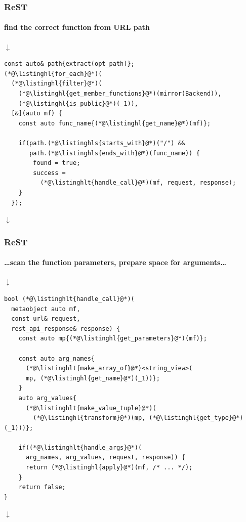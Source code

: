 \documentclass[compress,table,xcolor=table]{beamer}
\begin{document}
\begin{frame}[fragile]
  \frametitle{ReST}
  \framesubtitle{find the correct function from URL path}
  \smaller
  \centering $\downarrow$
  \begin{lstlisting}[language=c++2x,basicstyle=\footnotesize\ttfamily]
const auto& path{extract(opt_path)};
(*@\listinghl{for_each}@*)(
  (*@\listinghl{filter}@*)(
    (*@\listinghl{get_member_functions}@*)(mirror(Backend)),
    (*@\listinghl{is_public}@*)(_1)),
  [&](auto mf) {
    const auto func_name{(*@\listinghl{get_name}@*)(mf)};

    if(path.(*@\listinghls{starts_with}@*)("/") &&
       path.(*@\listinghls{ends_with}@*)(func_name)) {
        found = true;
        success =
          (*@\listinghlt{handle_call}@*)(mf, request, response);
    }
  });
  \end{lstlisting}
  \centering $\downarrow$
  \vfill
\end{frame}
\begin{frame}[fragile]
  \frametitle{ReST}
  \framesubtitle{\ldots scan the function parameters, prepare space for arguments\ldots}
  \smaller
  \centering $\downarrow$
  \begin{lstlisting}[language=c++2x,basicstyle=\scriptsize\ttfamily]
bool (*@\listinghlt{handle_call}@*)(
  metaobject auto mf,
  const url& request,
  rest_api_response& response) {
    const auto mp{(*@\listinghl{get_parameters}@*)(mf)};

    const auto arg_names{
      (*@\listinghlt{make_array_of}@*)<string_view>(
      mp, (*@\listinghl{get_name}@*)(_1))};
    }
    auto arg_values{
      (*@\listinghlt{make_value_tuple}@*)(
        (*@\listinghl{transform}@*)(mp, (*@\listinghl{get_type}@*)(_1)))};

    if((*@\listinghlt{handle_args}@*)(
      arg_names, arg_values, request, response)) {
      return (*@\listinghl{apply}@*)(mf, /* ... */);
    }
    return false;
}
  \end{lstlisting}
  \centering $\downarrow$
  \vfill
\end{frame}
\end{document}
